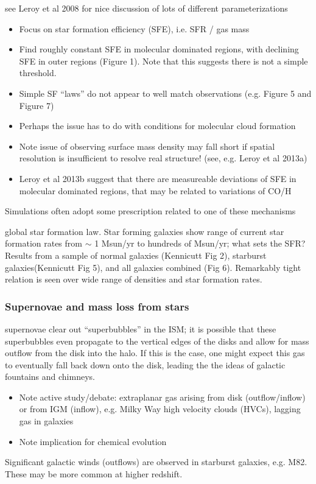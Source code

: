 \documentclass{article}
\begin{document}
see Leroy et al 2008 for nice discussion of lots of different
parameterizations
\begin{itemize}
    \item Focus on star formation efficiency (SFE), i.e. SFR / gas mass
    \item Find roughly constant SFE in molecular dominated regions, with
        declining SFE in outer regions (Figure 1). Note that this suggests
        there is not a simple threshold.
    \item Simple SF ``laws'' do not appear to well match observations (e.g.
        Figure 5 and Figure 7)
    \item Perhaps the issue has to do with conditions for molecular cloud
        formation
    \item Note issue of observing surface mass density may fall short if
        spatial resolution is insufficient to resolve real structure! (see,
        e.g. Leroy et al 2013a)
    \item Leroy et al 2013b suggest that there are measureable deviations
        of SFE in molecular dominated regions, that may be related to
        variations of CO/H
\end{itemize}
Simulations often adopt some prescription related to one of these
mechanisms

global star formation law. Star forming galaxies show range of current star
formation rates from $\sim$ 1 Msun/yr to hundreds of Msun/yr; what sets the
SFR? Results from a sample of normal galaxies (Kennicutt Fig 2), starburst
galaxies(Kennicutt Fig 5), and all galaxies combined (Fig 6). Remarkably
tight relation is seen over wide range of densities and star formation
rates.

\subsubsection{Supernovae and mass loss from stars}
supernovae clear out ``superbubbles'' in the ISM; it is possible that these
superbubbles even propagate to the vertical edges of the disks and allow
for mass outflow from the disk into the halo. If this is the case, one
might expect this gas to eventually fall back down onto the disk, leading
the the ideas of galactic fountains and chimneys.
\begin{itemize}
    \item Note active study/debate: extraplanar gas arising from disk
        (outflow/inflow) or from IGM (inflow), e.g. Milky Way high velocity
        clouds (HVCs), lagging gas in galaxies
    \item Note implication for chemical evolution
\end{itemize}
Significant galactic winds (outflows) are observed in starburst galaxies,
e.g. M82. These may be more common at higher redshift.
\end{document}
